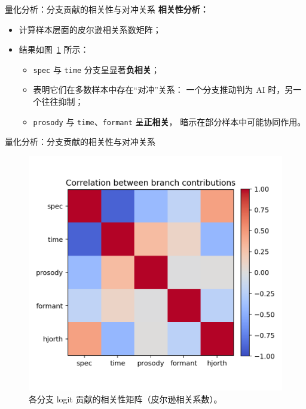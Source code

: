 \documentclass[aspectratio=169]{beamer}
\begin{document}
\begin{frame}{量化分析：分支贡献的相关性与对冲关系}
\textbf{相关性分析：}
\begin{itemize}
  \item 计算样本层面的皮尔逊相关系数矩阵；
  \item 结果如图~\ref{fig:contrib_corr} 所示：
    \begin{itemize}
      \item \texttt{spec} 与 \texttt{time} 分支呈显著\textbf{负相关}；
      \item 表明它们在多数样本中存在“对冲”关系：
        一个分支推动判为 AI 时，另一个往往抑制；
      \item \texttt{prosody} 与 \texttt{time}、\texttt{formant} 呈\textbf{正相关}，
        暗示在部分样本中可能协同作用。
    \end{itemize}
\end{itemize}

\end{frame}

\begin{frame}{量化分析：分支贡献的相关性与对冲关系}
\begin{figure}
  \centering
  \includegraphics[width=0.5\linewidth]{images_in_paper/contrib_correlation.png}
  \caption{各分支 logit 贡献的相关性矩阵（皮尔逊相关系数）。}
  \label{fig:contrib_corr}
\end{figure}

\end{frame}

%
%
\end{document}

